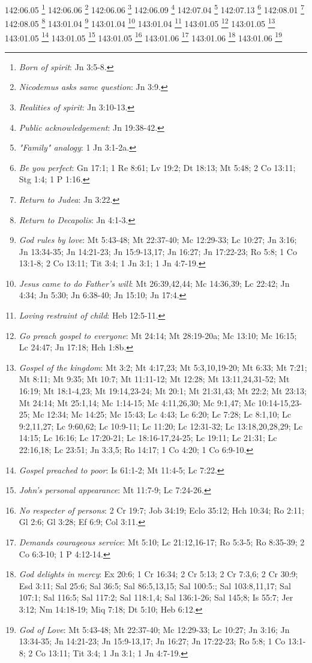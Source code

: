 {{{{{{{{{{{{{{{{{{{{{{{{{{{142:06.05 \footnote{\textit{Born of spirit}: Jn 3:5-8.}
142:06.06 \footnote{\textit{Nicodemus asks same question}: Jn 3:9.}
142:06.06 \footnote{\textit{Realities of spirit}: Jn 3:10-13.}
142:06.09 \footnote{\textit{Public acknowledgement}: Jn 19:38-42.}
142:07.04 \footnote{\textit{"Family" analogy}: 1 Jn 3:1-2a.}
142:07.13 \footnote{\textit{Be you perfect}: Gn 17:1; 1 Re 8:61; Lv 19:2; Dt 18:13; Mt 5:48; 2 Co 13:11; Stg 1:4; 1 P 1:16.}
142:08.01 \footnote{\textit{Return to Judea}: Jn 3:22.}
142:08.05 \footnote{\textit{Return to Decapolis}: Jn 4:1-3.}
143:01.04 \footnote{\textit{God rules by love}: Mt 5:43-48; Mt 22:37-40; Mc 12:29-33; Lc 10:27; Jn 3:16; Jn 13:34-35; Jn 14:21-23; Jn 15:9-13,17; Jn 16:27; Jn 17:22-23; Ro 5:8; 1 Co 13:1-8; 2 Co 13:11; Tit 3:4; 1 Jn 3:1; 1 Jn 4:7-19.}
143:01.04 \footnote{\textit{Jesus came to do Father's will}: Mt 26:39,42,44; Mc 14:36,39; Lc 22:42; Jn 4:34; Jn 5:30; Jn 6:38-40; Jn 15:10; Jn 17:4.}
143:01.04 \footnote{\textit{Loving restraint of child}: Heb 12:5-11.}
143:01.05 \footnote{\textit{Go preach gospel to everyone}: Mt 24:14; Mt 28:19-20a; Mc 13:10; Mc 16:15; Lc 24:47; Jn 17:18; Hch 1:8b.}
143:01.05 \footnote{\textit{Gospel of the kingdom}: Mt 3:2; Mt 4:17,23; Mt 5:3,10,19-20; Mt 6:33; Mt 7:21; Mt 8:11; Mt 9:35; Mt 10:7; Mt 11:11-12; Mt 12:28; Mt 13:11,24,31-52; Mt 16:19; Mt 18:1-4,23; Mt 19:14,23-24; Mt 20:1; Mt 21:31,43; Mt 22:2; Mt 23:13; Mt 24:14; Mt 25:1,14; Mc 1:14-15; Mc 4:11,26,30; Mc 9:1,47; Mc 10:14-15,23-25; Mc 12:34; Mc 14:25; Mc 15:43; Lc 4:43; Lc 6:20; Lc 7:28; Lc 8:1,10; Lc 9:2,11,27; Lc 9:60,62; Lc 10:9-11; Lc 11:20; Lc 12:31-32; Lc 13:18,20,28,29; Lc 14:15; Lc 16:16; Lc 17:20-21; Lc 18:16-17,24-25; Lc 19:11; Lc 21:31; Lc 22:16,18; Lc 23:51; Jn 3:3,5; Ro 14:17; 1 Co 4:20; 1 Co 6:9-10.}
143:01.05 \footnote{\textit{Gospel preached to poor}: Is 61:1-2; Mt 11:4-5; Lc 7:22.}
143:01.05 \footnote{\textit{John's personal appearance}: Mt 11:7-9; Lc 7:24-26.}
143:01.05 \footnote{\textit{No respecter of persons}: 2 Cr 19:7; Job 34:19; Eclo 35:12; Hch 10:34; Ro 2:11; Gl 2:6; Gl 3:28; Ef 6:9; Col 3:11.}
143:01.06 \footnote{\textit{Demands courageous service}: Mt 5:10; Lc 21:12,16-17; Ro 5:3-5; Ro 8:35-39; 2 Co 6:3-10; 1 P 4:12-14.}
143:01.06 \footnote{\textit{God delights in mercy}: Ex 20:6; 1 Cr 16:34; 2 Cr 5:13; 2 Cr 7:3,6; 2 Cr 30:9; Esd 3:11; Sal 25:6; Sal 36:5; Sal 86:5,13,15; Sal 100:5:; Sal 103:8,11,17; Sal 107:1; Sal 116:5; Sal 117:2; Sal 118:1,4; Sal 136:1-26; Sal 145;8; Is 55:7; Jer 3:12; Nm 14:18-19; Miq 7:18; Dt 5:10; Heb 6:12.}
143:01.06 \footnote{\textit{God of Love}: Mt 5:43-48; Mt 22:37-40; Mc 12:29-33; Lc 10:27; Jn 3:16; Jn 13:34-35; Jn 14:21-23; Jn 15:9-13,17; Jn 16:27; Jn 17:22-23; Ro 5:8; 1 Co 13:1-8; 2 Co 13:11; Tit 3:4; 1 Jn 3:1; 1 Jn 4:7-19.}
}}}}}}}}}}}}}}}}}}}}}}}}}}}
